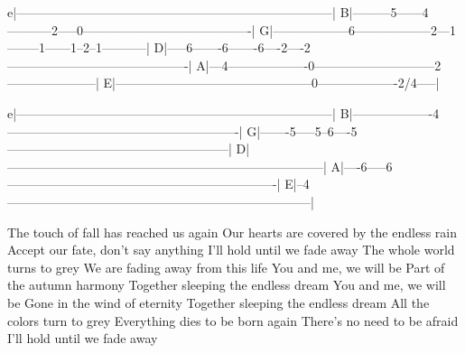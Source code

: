 \btab
e|---------------------------------------------------------------------------|
B|---------5------4-----------2-----0----------------------------------------|
G|------------------6------------------2---1--------1------1--2--1-----------|
D|-----6-------6-------6----2----2-------------------------------------------|
A|---4-------------------0-----------------------------2---------------------|
E|-----------------------------------------------0-------------------2/4-----|

e|---------------------------------------------------------------------------|
B|-------------------4-------------------------------------------------------|
G|-------5-----5--6----5-----------------------------------------------------|
D|---------------------------------------------------------------------------|
A|----6-----6----------------------------------------------------------------|
E|--4------------------------------------------------------------------------|
\etab

The touch of fall has reached us again
Our hearts are covered by the endless rain
Accept our fate, don't say anything
I'll hold until we fade away
The whole world turns to grey
We are fading away from this life
You and me, we will be
Part of the autumn harmony
Together sleeping the endless dream
You and me, we will be
Gone in the wind of eternity
Together sleeping the endless dream
All the colors turn to grey
Everything dies to be born again
There's no need to be afraid
I'll hold until we fade away


